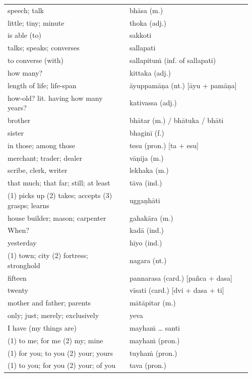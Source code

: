 \documentclass[11pt,oneside]{memoir}
\begin{document}
\begin{longtable}{L{0.48\linewidth} L{0.48\linewidth}}
speech; talk & bhāsa (m.)\\[0pt]
little; tiny; minute & thoka (adj.)\\[0pt]
is able (to) & sakkoti\\[0pt]
talks; speaks; converses & sallapati\\[0pt]
to converse (with) & sallapituṁ (inf. of sallapati)\\[0pt]
how many? & kittaka (adj.)\\[0pt]
length of life; life-span & āyuppamāṇa (nt.) [āyu + pamāṇa]\\[0pt]
how-old? lit. having how many years? & kativassa (adj.)\\[0pt]
brother & bhātar (m.) / bhātuka / bhāti\\[0pt]
sister & bhaginī (f.)\\[0pt]
in those; among those & tesu (pron.) [ta + esu]\\[0pt]
merchant; trader; dealer & vāṇija (m.)\\[0pt]
scribe, clerk, writer & lekhaka (m.)\\[0pt]
that much; that far; still; at least & tāva (ind.)\\[0pt]
(1) picks up (2) takes; accepts (3) grasps; learns & uggaṇhāti\\[0pt]
house builder; mason; carpenter & gahakāra (m.)\\[0pt]
When? & kadā (ind.)\\[0pt]
yesterday & hīyo (ind.)\\[0pt]
(1) town; city (2) fortress; stronghold & nagara (nt.)\\[0pt]
fifteen & pannarasa (card.) [pañca + dasa]\\[0pt]
twenty & vīsati (card.) [dvi + dasa + ti]\\[0pt]
mother and father; parents & mātāpitar (m.)\\[0pt]
only; just; merely; exclusively & yeva\\[0pt]
I have (my things are) & mayhaṁ \ldots{} santi\\[0pt]
(1) to me; for me (2) my; mine & mayhaṁ (pron.)\\[0pt]
(1) for you; to you (2) your; yours & tuyhaṁ (pron.)\\[0pt]
(1) to you; for you (2) your; of you & tava (pron.)\\[0pt]
\end{longtable}

\enlargethispage*{-\baselineskip}
\renewcommand{\arraystretch}{1.25}
\end{document}
